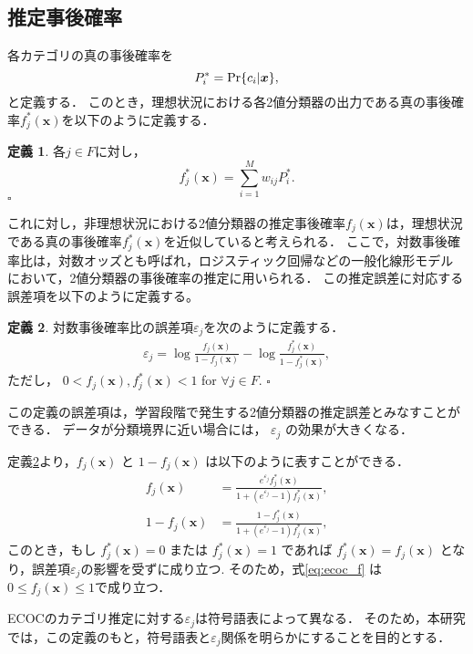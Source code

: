\documentclass{jarticle}
\theoremstyle{definition}
\newtheorem{definition}{定義}
\def\QED{\hfill$\square$}
\begin{document}
\subsection{推定事後確率}
各カテゴリの真の事後確率を
\begin{equation}\label{eq:MAP}
    P^*_i = {\rm Pr}\{c_i|\bm{x}\},
\end{equation}
と定義する．
このとき，理想状況における各2値分類器の出力である真の事後確率$f^*_j(\bm{x})$を以下のように定義する．
\begin{definition}\label{def:MAPbinary}
各$j \in F$に対し，
 \begin{equation}\label{eq:MAPecoc}
    f^*_j(\bm{x}) = \sum_{i = 1}^M w_{ij}P^*_i.
\end{equation}
\QED \end{definition}
これに対し，非理想状況における2値分類器の推定事後確率$f_j(\bm{x})$は，理想状況である真の事後確率$f^*_j(\bm{x})$を近似していると考えられる．
ここで，対数事後確率比は，対数オッズとも呼ばれ，ロジスティック回帰などの一般化線形モデル \cite{friedman2001elements}において，2値分類器の事後確率の推定に用いられる．
この推定誤差に対応する誤差項を以下のように定義する。
\begin{definition}\label{def:ECOC_noise}
対数事後確率比の誤差項$\varepsilon_j$を次のように定義する．
\begin{align}\label{eq:ecoc_noise}
\varepsilon_j = \log \frac{f_j(\bm{x})}{1-f_j(\bm{x})} - \log \frac{f^*_j(\bm{x})}{1-f^*_j(\bm{x})},
\end{align}
ただし， $0<f_j(\bm{x}), f^*_j(\bm{x}) < 1$ for $\forall j \in F$.
\QED \end{definition} 
この定義の誤差項は，学習段階で発生する2値分類器の推定誤差とみなすことができる．
データが分類境界に近い場合には， $\varepsilon_j$ の効果が大きくなる．

定義\ref{def:ECOC_noise}より，$f_j(\bm{x})$ と $1-f_j(\bm{x})$ は以下のように表すことができる．
\begin{align}\label{eq:ecoc_f}
    f_j(\bm{x}) &= \frac{e^{\varepsilon_j} f^*_j(\bm{x})}{1 + (e^{\varepsilon_j} - 1) f^*_j(\bm{x})},\\
    1 - f_j(\bm{x}) &= \frac{1 - f^*_j(\bm{x})}{1 + (e^{\varepsilon_j} - 1) f^*_j(\bm{x})},
\end{align}
このとき，もし $f^*_j(\bm{x})=0$ または $f^*_j(\bm{x})=1$ であれば $f^*_j(\bm{x})=f_j(\bm{x})$ となり，誤差項$\varepsilon_j$の影響を受ずに成り立つ.
そのため，式\eqref{eq:ecoc_f} は $0 \leq f_j(\bm{x}) \leq 1$で成り立つ．

ECOCのカテゴリ推定に対する$\varepsilon_j$は符号語表によって異なる．
そのため，本研究では，この定義のもと，符号語表と$\varepsilon_j$関係を明らかにすることを目的とする．
\end{document}
